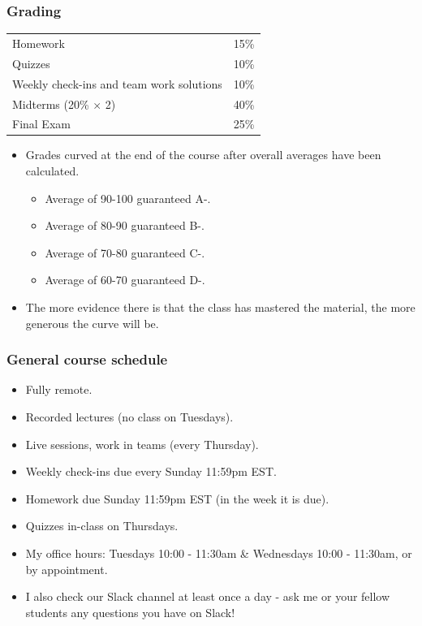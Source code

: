 \documentclass[slidestop,compress,mathserif]{beamer}
\begin{document}
\begin{frame}
\frametitle{Grading}

\begin{center}
\begin{tabular}{l l }%
Homework 	& 15\%	\\
Quizzes 	& 10\%	\\
Weekly check-ins and team work solutions & 10\% \\
Midterms (20\% $\times$ 2) 	& 40\%	\\
 Final Exam		& 25\%	
\end{tabular}
\end{center}

\pause
\begin{itemize}
\item Grades curved at the end of the course after overall averages have been calculated.
\begin{itemize}
\item Average of 90-100 guaranteed A-.
\item Average of 80-90 guaranteed B-.
\item Average of 70-80 guaranteed C-.
\item Average of 60-70 guaranteed D-.
\end{itemize}
\item The more evidence there is that the class has mastered the material, the more generous the curve will be.
\end{itemize}


\end{frame}


\begin{frame}
\frametitle{General course schedule}

\begin{itemize}
\item Fully remote.

\item Recorded lectures (no class on Tuesdays).

\item Live sessions, work in teams (every Thursday).

\item Weekly check-ins due every Sunday 11:59pm EST.

\item Homework due Sunday 11:59pm EST (in the week it is due).

\item Quizzes in-class on Thursdays.

\item My office hours: Tuesdays 10:00 - 11:30am \& Wednesdays 10:00 - 11:30am, or by appointment. 

\item I also check our Slack channel at least once a day - ask me or your fellow students any questions you have on Slack!
\end{itemize}
\end{frame}
\end{document}
